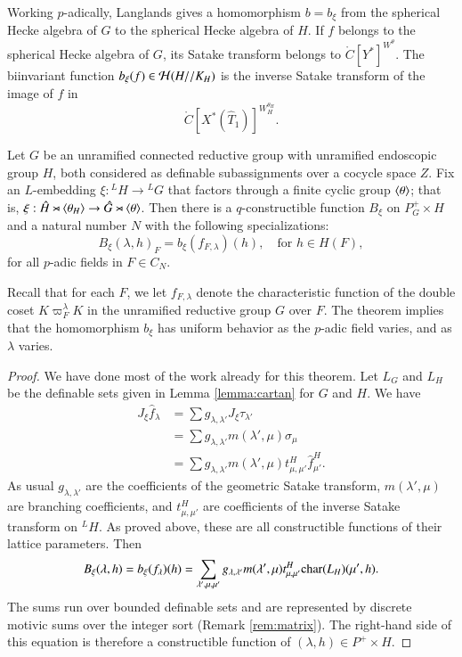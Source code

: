 Working $p$-adically, Langlands gives a homomorphism
$b = b_\xi$ from the spherical Hecke algebra of $G$ to the spherical
Hecke algebra of $H$.  If $f$ belongs to the spherical Hecke algebra
of $G$, its Satake transform belongs to $\ring{C}[Y^*]^{W^\theta}$.
The biinvariant function $b_\xi(f)\in\mathcal H(H//K_H)$ is the inverse
Satake transform of the image of $f$ in
\[
\ring{C}[X^*(\hat T_1)]^{W_H^{\theta_H}}.
\]

\begin{theorem}\label{thm:B}
  Let $G$ be an unramified connected reductive group with unramified
  endoscopic group $H$, both considered as definable subassignments
  over a cocycle space $Z$.  Fix an $L$-embedding $\xi:{}^LH\to {}^LG$
  that factors through a finite cyclic group $\langle{\theta}\rangle$; that is,
  $\xi:\hat H\rtimes \langle{\theta_H}\rangle \to \hat G \rtimes \langle{\theta}\rangle$.
  Then there is a $q$-constructible function $B_\xi$ on $P^+_G\times H$
  and a natural number $N$ with the following specializations:
\[
B_\xi(\lambda,h)_F = b_\xi(f_{F,\lambda})(h),\quad \text{for } h\in H(F),
\]
for all $p$-adic fields in $F\in C_N$.  
\end{theorem}

Recall that for each $F$, we let $f_{F,\lambda}$ denote the
characteristic function of the double coset $K\varpi_F^\lambda K$ in
the unramified reductive group $G$ over $F$.  The theorem implies that
the homomorphism $b_\xi$ has uniform behavior as the $p$-adic field
varies, and as $\lambda$ varies.

\begin{proof}
  We have done most of the work already for this theorem.  Let $L_G$
  and $L_H$ be the definable sets given in Lemma \ref{lemma:cartan}
  for $G$ and $H$.  
   We have
  \begin{align*}
    J_\xi \hat f_\lambda  &= 
\sum  g_{\lambda,\lambda'} J_\xi\tau_{\lambda'}
\\ &=
\sum g_{\lambda,\lambda'} m(\lambda',\mu) \sigma_\mu 
\\ &=
\sum g_{\lambda,\lambda'} m(\lambda',\mu) t^H_{\mu,\mu'} \hat f_{\mu'}^H.           
    \end{align*}
As usual $g_{\lambda,\lambda'}$ are the coefficients of the geometric
Satake
transform, $m(\lambda',\mu)$ are branching coefficients, and
$t^H_{\mu,\mu'}$ are coefficients of the inverse Satake transform on
${}^LH$.  As proved above, these are all constructible functions of
their
lattice parameters.
Then
\[
B_\xi(\lambda,h) = b_\xi(f_\lambda)(h) =
\sum_{\lambda',\mu,\mu'} g_{\lambda,\lambda'} m(\lambda',\mu)
t^H_{\mu,\mu'}
{\operatorname{char}}(L_H)(\mu',h).
\]
The sums run over bounded definable sets and are represented by
discrete motivic sums over the integer sort (Remark \ref{rem:matrix}).  
The right-hand side of
this
equation is therefore a constructible function of $(\lambda,h)\in
P^+\times H$.
\end{proof}


